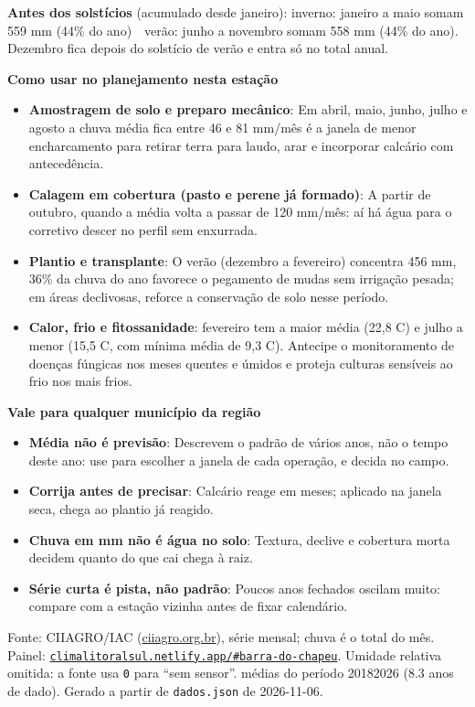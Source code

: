 \documentclass[10pt,a4paper]{article}
\begin{document}
\vspace{1pt}
{\footnotesize\textbf{Antes dos solstícios} (acumulado desde janeiro):
inverno: janeiro a maio somam 559 mm (44\% do ano) \,\textbullet\, verão: junho a novembro somam 558 mm (44\% do ano). Dezembro fica depois do solstício de verão e entra só no total
anual.}

\vspace{2pt}
{\bfseries\small Como usar no planejamento nesta estação}

\footnotesize\begin{itemize}\setlength{\itemsep}{0.5pt}
  \item \textbf{Amostragem de solo e preparo mecânico}: Em abril, maio, junho, julho e agosto a chuva média fica entre 46 e 81 mm/mês \textemdash{} é a janela de menor encharcamento para retirar terra para laudo, arar e incorporar calcário com antecedência.
  \item \textbf{Calagem em cobertura (pasto e perene já formado)}: A partir de outubro, quando a média volta a passar de 120 mm/mês: aí há água para o corretivo descer no perfil sem enxurrada.
  \item \textbf{Plantio e transplante}: O verão (dezembro a fevereiro) concentra 456 mm, 36\% da chuva do ano \textemdash{} favorece o pegamento de mudas sem irrigação pesada; em áreas declivosas, reforce a conservação de solo nesse período.
  \item \textbf{Calor, frio e fitossanidade}: fevereiro tem a maior média (22,8 \textdegree{}C) e julho a menor (15,5 \textdegree{}C, com mínima média de 9,3 \textdegree{}C). Antecipe o monitoramento de doenças fúngicas nos meses quentes e úmidos e proteja culturas sensíveis ao frio nos mais frios.
\end{itemize}

\vspace{1pt}
{\bfseries\small Vale para qualquer município da região}

\scriptsize\begin{itemize}\setlength{\itemsep}{0.5pt}
  \item \textbf{Média não é previsão}: Descrevem o padrão de vários anos, não o tempo deste ano: use para escolher a janela de cada operação, e decida no campo.
  \item \textbf{Corrija antes de precisar}: Calcário reage em meses; aplicado na janela seca, chega ao plantio já reagido.
  \item \textbf{Chuva em mm não é água no solo}: Textura, declive e cobertura morta decidem quanto do que cai chega à raiz.
  \item \textbf{Série curta é pista, não padrão}: Poucos anos fechados oscilam muito: compare com a estação vizinha antes de fixar calendário.
\end{itemize}

\vspace{1pt}
{\tiny\color{cinza}
Fonte: CIIAGRO/IAC (\href{http://ciiagro.org.br}{ciiagro.org.br}), série mensal;
chuva é o total do mês. Painel:
\href{https://climalitoralsul.netlify.app/\#barra-do-chapeu}%
{\texttt{climalitoralsul.netlify.app/\#barra-do-chapeu}}.
Umidade relativa omitida: a fonte usa \texttt{0} para ``sem sensor''. 
médias do período 2018\textendash{}2026 (8.3 anos de dado).
Gerado a partir de \texttt{dados.json} de 2026-11-06.}
\end{document}
